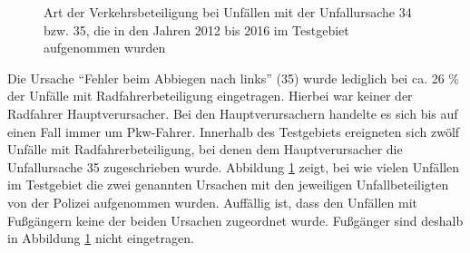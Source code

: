 \begin{savenotes}
	\begin{figure} [H]
		\caption[Art der Verkehrsbeteiligung bei Unfällen mit der Unfallursache 34 bzw. 35, die in den Jahren 2012 bis 2016 im Testgebiet aufgenommen wurden]{Art der Verkehrsbeteiligung bei Unfällen mit der Unfallursache 34 bzw. 35, die in den Jahren 2012 bis 2016 im Testgebiet aufgenommen wurden}\label{fig:Urs34/35_Verkehrsbeteiligung} 
	\end{figure}
\end{savenotes}

Die Ursache \enquote{Fehler beim Abbiegen nach links} (35) wurde lediglich bei ca. 26 \% der Unfälle mit Radfahrerbeteiligung eingetragen. Hierbei war keiner der Radfahrer Hauptverursacher. Bei den Hauptverursachern handelte es sich bis auf einen Fall immer um Pkw-Fahrer. Innerhalb des Testgebiets ereigneten sich zwölf Unfälle mit Radfahrerbeteiligung, bei denen dem Hauptverursacher die Unfallursache 35 zugeschrieben wurde. Abbildung \ref{fig:Urs34/35_Verkehrsbeteiligung} zeigt, bei wie vielen Unfällen im Testgebiet die zwei genannten Ursachen mit den jeweiligen Unfallbeteiligten von der Polizei aufgenommen wurden. Auffällig ist, dass den Unfällen mit Fußgängern keine der beiden Ursachen zugeordnet wurde. Fußgänger sind deshalb in Abbildung \ref{fig:Urs34/35_Verkehrsbeteiligung} nicht eingetragen.

